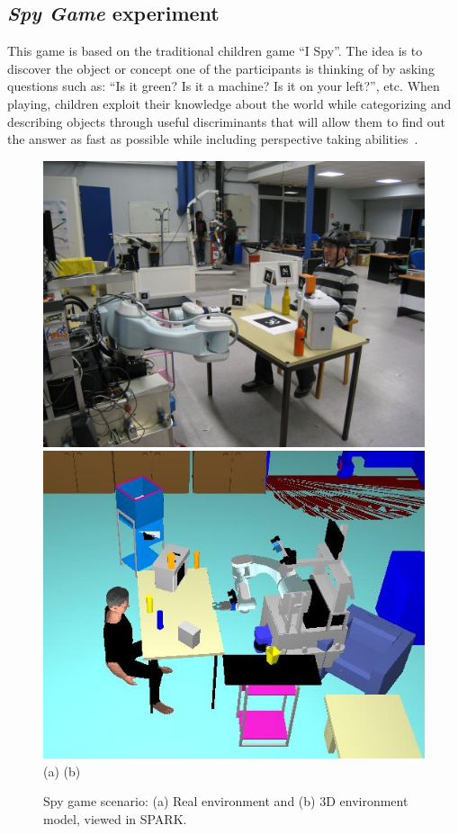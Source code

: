 \documentclass[twocolumn]{svjour3}
\begin{document}
\subsection{\emph{Spy Game} experiment}

\label{spygame}

This game is based on the traditional children game ``I Spy''. The idea is to
discover the object or concept one of the participants is thinking of by asking
questions such as: ``Is it green? Is it a machine? Is it on your left?'', etc.
When playing, children exploit their knowledge about the world while
categorizing and describing objects through useful discriminants that will
allow them to find out the answer as fast as possible while including
perspective taking abilities~\cite{Moll2006}.

\begin{figure}
\centering
\includegraphics[width=0.45\columnwidth]{images/spy-game-real.jpg}
\includegraphics[width=0.45\columnwidth]{images/spy-game-mhp.jpg}
\flushleft
\hspace{1.8cm} (a) \hspace{3.9cm} (b)
\caption{Spy game scenario: (a) Real environment and (b) 3D environment model, viewed in \textsc{SPARK}.}
\label{fig|spyGameScenario}
\end{figure}
\end{document}
